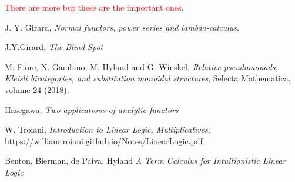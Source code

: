 \documentclass[12pt]{article}
\theoremstyle{plain}
\theoremstyle{definition}
\begin{document}
\textcolor{red}{There are more but these are the important ones.}

\begin{thebibliography}{9}
	 J. Y. Girard, \emph{Normal functors, power series and lambda-calculus}.
	
	 J.Y.Girard, \emph{The Blind Spot}

	 M. Fiore, N. Gambino, M. Hyland and G. Winskel, \emph{Relative pseudomonads, Kleisli bicategories,
and substitution monoidal structures}, Selecta Mathematica, volume 24 (2018).
	
	 Hasegawa, \emph{Two applications of analytic functors}
	
	 W. Troiani, \emph{Introduction to Linear Logic, Multiplicatives}, \url{https://williamtroiani.github.io/Notes/LinearLogic.pdf}
	
	 Benton, Bierman, de Paiva, Hyland \emph{A Term Calculus for Intuitionistic Linear Logic}
	\end{thebibliography}
\end{document}

